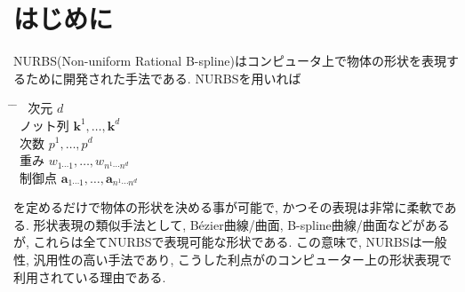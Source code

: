 \documentclass{jsarticle}
\theoremstyle{definition}%
\begin{document}
\section*{はじめに}
NURBS(Non-uniform Rational B-spline)はコンピュータ上で物体の形状を表現するために開発された手法である.
NURBSを用いれば
\begin{tabbing}
    \hspace{5.2mm} \= \hspace{20mm} \= \hspace{30mm} \kill
    \>  \, 次元 \> $d$ \\
    \>  \, ノット列 \> $\bm{k}^1,\dots,\bm{k}^d$ \\
    \>  \, 次数 \> $p^1,\dots,p^d$ \\
    \>  \, 重み \> $w_{1\cdots 1},\dots,w_{n^1\cdots n^d}$ \\
    \>  \, 制御点 \> $\bm{a}_{1\cdots 1},\dots,\bm{a}_{n^1\cdots n^d}$
\end{tabbing}
を定めるだけで物体の形状を決める事が可能で, かつその表現は非常に柔軟である.
形状表現の類似手法として, B\'ezier曲線/曲面, B-spline曲線/曲面などがあるが, これらは全てNURBSで表現可能な形状である.
この意味で, NURBSは一般性, 汎用性の高い手法であり, こうした利点がのコンピューター上の形状表現で利用されている理由である.



\end{document}
